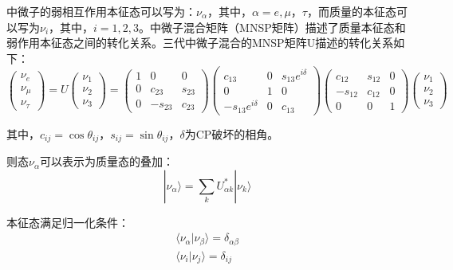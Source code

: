 \documentclass[10pt,a4paper]{article}
\begin{document}
中微子的弱相互作用本征态可以写为：$\nu_{\alpha}$，其中，$\alpha=e,\mu，\tau$，而质量的本征态可以写为$\nu_{i}$，其中，$i=1,2,3$。中微子混合矩阵（MNSP矩阵）描述了质量本征态和弱作用本征态之间的转化关系。三代中微子混合的MNSP矩阵U描述的转化关系如下：
\begin{equation}
\label{con:eq1}
\begin{pmatrix}
 \nu_e  \\
 \nu_{\mu}  \\
 \nu_{\tau}
 \end{pmatrix}
 =U \begin{pmatrix}
 \nu_1  \\
 \nu_2  \\
 \nu_3
 \end{pmatrix}
 = \begin{pmatrix}
 1 & 0 & 0 \\
 0 & c_{23} & s_{23} \\
 0 & -s_{23} & c_{23}
 \end{pmatrix}
 \begin{pmatrix}
 c_{13} & 0 & s_{13}e^{i\delta} \\
 0 & 1 & 0 \\
 -s_{13}e^{i\delta} & 0 & c_{13}
 \end{pmatrix} 
 \begin{pmatrix}
 c_{12} & s_{12} & 0 \\
 -s_{12} & c_{12} & 0 \\
 0 & 0 & 1
 \end{pmatrix}
 \begin{pmatrix}
 \nu_1  \\
 \nu_2  \\
 \nu_3
 \end{pmatrix}
\end{equation}


其中，$c_{ij}=\cos{\theta_{ij}}$，$s_{ij}=\sin{\theta_{ij}}$，$\delta$为CP破坏的相角\cite{2009Experimental}。


则态$\nu_{\alpha}$可以表示为质量态的叠加：
\begin{equation}
\label{con:eq2}
|\nu_{\alpha}\rangle=\sum_{k}U_{\alpha k}^{*}|\nu_{k}\rangle
\end{equation}


本征态满足归一化条件：
\begin{equation}
\label{con:eq3}
\begin{split}
\langle \nu_{\alpha}|\nu_{\beta}\rangle=\delta_{\alpha\beta}\\
\langle\nu_{i}|\nu_{j}\rangle=\delta_{ij}
\end{split}
\end{equation}
\end{document}
